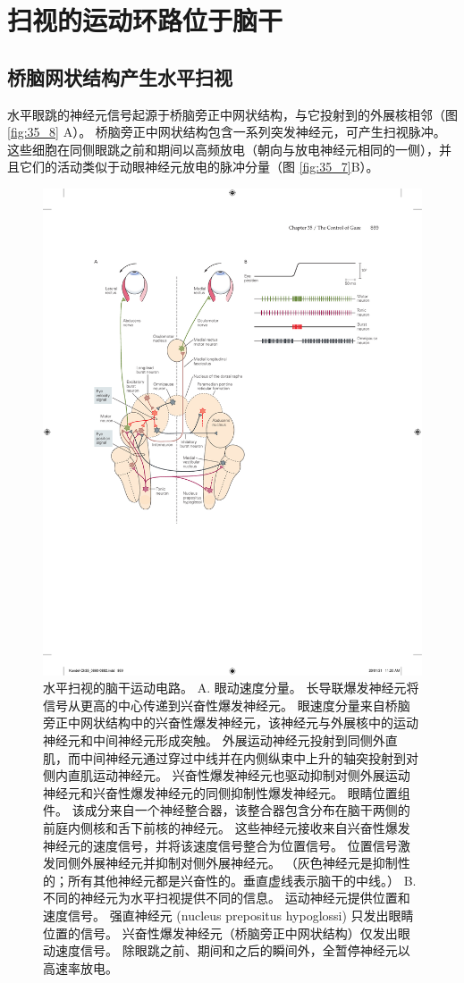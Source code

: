 \section{扫视的运动环路位于脑干}

\subsection{桥脑网状结构产生水平扫视}

水平眼跳的神经元信号起源于桥脑旁正中网状结构，与它投射到的外展核相邻（图 \ref{fig:35_8} A）。
桥脑旁正中网状结构包含一系列突发神经元，可产生扫视脉冲。
这些细胞在同侧眼跳之前和期间以高频放电（朝向与放电神经元相同的一侧），并且它们的活动类似于动眼神经元放电的脉冲分量（图 \ref{fig:35_7}B）。


\begin{figure}[htbp]
	\centering
	\includegraphics[width=0.95\linewidth]{chap35/fig_35_8}
	\caption{水平扫视的脑干运动电路。 
		A. 眼动速度分量。 长导联爆发神经元将信号从更高的中心传递到兴奋性爆发神经元。 眼速度分量来自桥脑旁正中网状结构中的兴奋性爆发神经元，该神经元与外展核中的运动神经元和中间神经元形成突触。 外展运动神经元投射到同侧外直肌，而中间神经元通过穿过中线并在内侧纵束中上升的轴突投射到对侧内直肌运动神经元。 兴奋性爆发神经元也驱动抑制对侧外展运动神经元和兴奋性爆发神经元的同侧抑制性爆发神经元。 眼睛位置组件。 该成分来自一个神经整合器，该整合器包含分布在脑干两侧的前庭内侧核和舌下前核的神经元。 这些神经元接收来自兴奋性爆发神经元的速度信号，并将该速度信号整合为位置信号。 位置信号激发同侧外展神经元并抑制对侧外展神经元。 （灰色神经元是抑制性的；所有其他神经元都是兴奋性的。垂直虚线表示脑干的中线。） B. 不同的神经元为水平扫视提供不同的信息。 运动神经元提供位置和速度信号。 强直神经元 (nucleus prepositus hypoglossi) 只发出眼睛位置的信号。 兴奋性爆发神经元（桥脑旁正中网状结构）仅发出眼动速度信号。 除眼跳之前、期间和之后的瞬间外，全暂停神经元以高速率放电。}

\end{figure}
